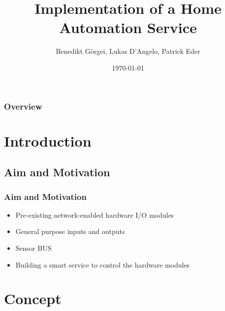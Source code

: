 \documentclass[aspectratio=169]{beamer}
\title[Smart Services Development]{Implementation of a Home Automation Service} %
\author{Benedikt Görgei, Lukas D'Angelo, Patrick Eder} %
\institute[] %
{
Technische Universität Graz \\ %
\medskip
\texttt{benedikt.goergei@student.tugraz.at, lukas.dangelo@student.tugraz.at, patrick.eder@student.tugraz.at} %
}
\date{\today} %
\begin{document}
\begin{frame}
\titlepage %
\end{frame}

\begin{frame}
\frametitle{Overview} %
\tableofcontents %
\end{frame}


\section{Introduction} %
\subsection{Aim and Motivation}
\begin{frame}
\frametitle{Aim and Motivation}
\begin{itemize}
\item Pre-existing network-enabled hardware I/O modules
\item General purpose inputs and outputs 
\item Sensor BUS
\item Building a smart service to control the hardware modules
\end{itemize}
\end{frame}

\section{Concept}
\end{document}
